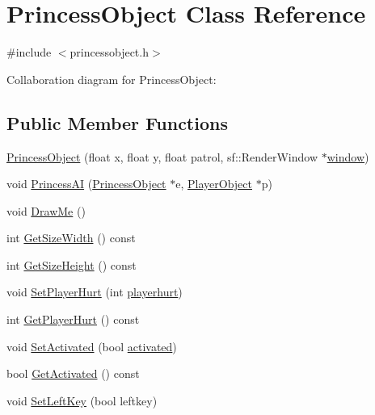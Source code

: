 \hypertarget{classPrincessObject}{}\section{Princess\+Object Class Reference}
\label{classPrincessObject}


{\ttfamily \#include $<$princessobject.\+h$>$}



Collaboration diagram for Princess\+Object\+:
\subsection*{Public Member Functions}
\begin{DoxyCompactItemize}
\item 
\hyperlink{classPrincessObject_a1519ac26645da43f266343fbb522a07c}{Princess\+Object} (float x, float y, float patrol, sf\+::\+Render\+Window $\ast$\hyperlink{classPrincessObject_abcf11c1e0917384e52839524ab1e5ee4}{window})
\item 
void \hyperlink{classPrincessObject_a05676486c179f8b574ac095758b400a4}{Princess\+AI} (\hyperlink{classPrincessObject}{Princess\+Object} $\ast$e, \hyperlink{classPlayerObject}{Player\+Object} $\ast$p)
\item 
void \hyperlink{classPrincessObject_a530610d0d21f1ec24e0d5af175ebc6eb}{Draw\+Me} ()
\item 
int \hyperlink{classPrincessObject_a0c892c7ac3cc350582e22eedce119608}{Get\+Size\+Width} () const 
\item 
int \hyperlink{classPrincessObject_a12ba51304f9e5eebc7916d3f239838fb}{Get\+Size\+Height} () const 
\item 
void \hyperlink{classPrincessObject_a8b17616d680bb6eefd20484745d7bff7}{Set\+Player\+Hurt} (int \hyperlink{classPrincessObject_a1fd444137bd6b911d44c5159eeb99863}{playerhurt})
\item 
int \hyperlink{classPrincessObject_ace9df317140fe48d3edb254a10d29ca7}{Get\+Player\+Hurt} () const 
\item 
void \hyperlink{classPrincessObject_ad4fed7d55ec5432c65525f7c82ac0077}{Set\+Activated} (bool \hyperlink{classPrincessObject_ab53915633585fac72d486a9f2186e290}{activated})
\item 
bool \hyperlink{classPrincessObject_aeafa61d8faf3808f9fd0fb1de0c62ece}{Get\+Activated} () const 
\item 
void \hyperlink{classPrincessObject_a4eb78ed6471a5e2feb4a1a9d26467a33}{Set\+Left\+Key} (bool leftkey)

\end{DoxyCompactItemize}
